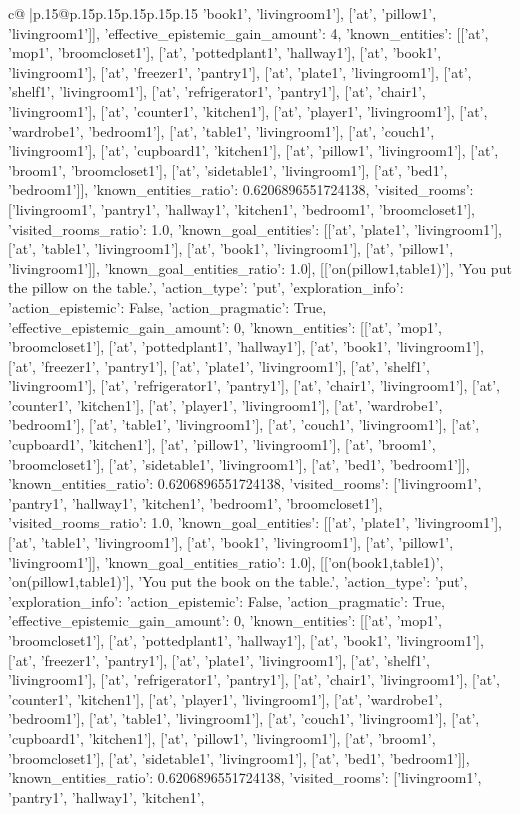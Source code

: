 \documentclass{article}
\begin{document}
{\begin{supertabular}{c@{$\;$}|p{.15\linewidth}@{}p{.15\linewidth}p{.15\linewidth}p{.15\linewidth}p{.15\linewidth}p{.15\linewidth}}
{{{'book1', 'livingroom1'], ['at', 'pillow1', 'livingroom1']], 'effective_epistemic_gain_amount': 4, 'known_entities': [['at', 'mop1', 'broomcloset1'], ['at', 'pottedplant1', 'hallway1'], ['at', 'book1', 'livingroom1'], ['at', 'freezer1', 'pantry1'], ['at', 'plate1', 'livingroom1'], ['at', 'shelf1', 'livingroom1'], ['at', 'refrigerator1', 'pantry1'], ['at', 'chair1', 'livingroom1'], ['at', 'counter1', 'kitchen1'], ['at', 'player1', 'livingroom1'], ['at', 'wardrobe1', 'bedroom1'], ['at', 'table1', 'livingroom1'], ['at', 'couch1', 'livingroom1'], ['at', 'cupboard1', 'kitchen1'], ['at', 'pillow1', 'livingroom1'], ['at', 'broom1', 'broomcloset1'], ['at', 'sidetable1', 'livingroom1'], ['at', 'bed1', 'bedroom1']], 'known_entities_ratio': 0.6206896551724138, 'visited_rooms': ['livingroom1', 'pantry1', 'hallway1', 'kitchen1', 'bedroom1', 'broomcloset1'], 'visited_rooms_ratio': 1.0, 'known_goal_entities': [['at', 'plate1', 'livingroom1'], ['at', 'table1', 'livingroom1'], ['at', 'book1', 'livingroom1'], ['at', 'pillow1', 'livingroom1']], 'known_goal_entities_ratio': 1.0}}], [['on(pillow1,table1)'], 'You put the pillow on the table.', {'action_type': 'put', 'exploration_info': {'action_epistemic': False, 'action_pragmatic': True, 'effective_epistemic_gain_amount': 0, 'known_entities': [['at', 'mop1', 'broomcloset1'], ['at', 'pottedplant1', 'hallway1'], ['at', 'book1', 'livingroom1'], ['at', 'freezer1', 'pantry1'], ['at', 'plate1', 'livingroom1'], ['at', 'shelf1', 'livingroom1'], ['at', 'refrigerator1', 'pantry1'], ['at', 'chair1', 'livingroom1'], ['at', 'counter1', 'kitchen1'], ['at', 'player1', 'livingroom1'], ['at', 'wardrobe1', 'bedroom1'], ['at', 'table1', 'livingroom1'], ['at', 'couch1', 'livingroom1'], ['at', 'cupboard1', 'kitchen1'], ['at', 'pillow1', 'livingroom1'], ['at', 'broom1', 'broomcloset1'], ['at', 'sidetable1', 'livingroom1'], ['at', 'bed1', 'bedroom1']], 'known_entities_ratio': 0.6206896551724138, 'visited_rooms': ['livingroom1', 'pantry1', 'hallway1', 'kitchen1', 'bedroom1', 'broomcloset1'], 'visited_rooms_ratio': 1.0, 'known_goal_entities': [['at', 'plate1', 'livingroom1'], ['at', 'table1', 'livingroom1'], ['at', 'book1', 'livingroom1'], ['at', 'pillow1', 'livingroom1']], 'known_goal_entities_ratio': 1.0}}], [['on(book1,table1)', 'on(pillow1,table1)'], 'You put the book on the table.', {'action_type': 'put', 'exploration_info': {'action_epistemic': False, 'action_pragmatic': True, 'effective_epistemic_gain_amount': 0, 'known_entities': [['at', 'mop1', 'broomcloset1'], ['at', 'pottedplant1', 'hallway1'], ['at', 'book1', 'livingroom1'], ['at', 'freezer1', 'pantry1'], ['at', 'plate1', 'livingroom1'], ['at', 'shelf1', 'livingroom1'], ['at', 'refrigerator1', 'pantry1'], ['at', 'chair1', 'livingroom1'], ['at', 'counter1', 'kitchen1'], ['at', 'player1', 'livingroom1'], ['at', 'wardrobe1', 'bedroom1'], ['at', 'table1', 'livingroom1'], ['at', 'couch1', 'livingroom1'], ['at', 'cupboard1', 'kitchen1'], ['at', 'pillow1', 'livingroom1'], ['at', 'broom1', 'broomcloset1'], ['at', 'sidetable1', 'livingroom1'], ['at', 'bed1', 'bedroom1']], 'known_entities_ratio': 0.6206896551724138, 'visited_rooms': ['livingroom1', 'pantry1', 'hallway1', 'kitchen1', }}}
\end{supertabular}}
\end{document}

